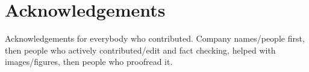 \chapter*{Acknowledgements}
\label{chap:acks}
Acknowledgements for everybody who contributed. Company names/people first, then people who actively contributed/edit and fact checking, helped with images/figures, then people who proofread it.

